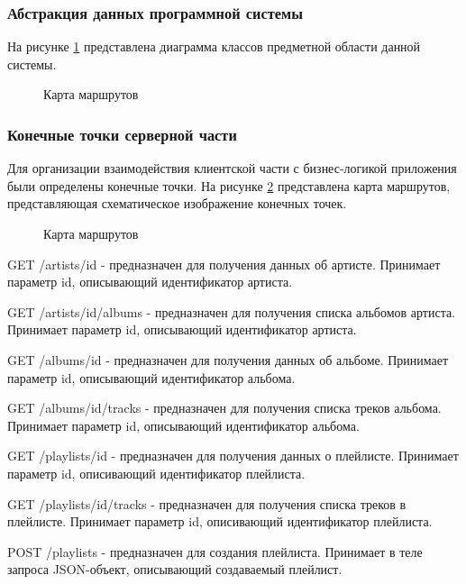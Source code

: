 \subsubsection{Абстракция данных программной системы}
На рисунке \ref{domainClass:image} представлена диаграмма классов предметной области данной системы.

\begin{figure}[ht]
	\caption{Карта маршрутов}
	\label{domainClass:image}
\end{figure}

\subsubsection{Конечные точки серверной части}

Для организации взаимодействия клиентской части с бизнес-логикой приложения были определены конечные точки. На рисунке \ref{routeMap:image} представлена карта маршрутов, представляющая схематическое изображение конечных точек.

\begin{figure}[ht]
	\caption{Карта маршрутов}
	\label{routeMap:image}
\end{figure}

GET /artists/{id} - предназначен для получения данных об артисте. Принимает параметр id, описывающий идентификатор артиста.

GET /artists/{id}/albums - предназначен для получения списка альбомов артиста. Принимает параметр id, описывающий идентификатор артиста.

GET /albums/{id} - предназначен для получения данных об альбоме. Принимает параметр id, описывающий идентификатор альбома.

GET /albums/{id}/tracks - предназначен для получения списка треков альбома. Принимает параметр id, описывающий идентификатор альбома.

GET /playlists/{id} - предназначен для получения данных о плейлисте. Принимает параметр id, описивающий идентификатор плейлиста.

GET /playlists/{id}/tracks - предназначен для получения списка треков в плейлисте. Принимает параметр id, описивающий идентификатор плейлиста.

POST /playlists - предназначен для создания плейлиста. Принимает в теле запроса JSON-объект, описывающий создаваемый плейлист.

